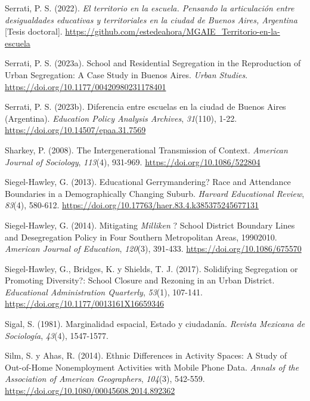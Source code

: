 \documentclass[
  spanish,
  a4paper,%
  chapterprefix=true,%
  DIV=calc,%
  twoside]{scrbook}%
\newlength{\cslhangindent}
\newenvironment{CSLReferences}[2] %
 {\begin{list}{}{%
  \setlength{\itemindent}{0pt}
  \setlength{\leftmargin}{0pt}
  \setlength{\parsep}{0pt}
  \ifodd #1
   \setlength{\leftmargin}{\cslhangindent}
   \setlength{\itemindent}{-1\cslhangindent}
  \fi
  \setlength{\itemsep}{#2\baselineskip}}}
 {\end{list}}
\begin{document}
\begin{CSLReferences}{1}{0}
Serrati, P. S. (2022). \emph{El territorio en la escuela. Pensando la articulación entre desigualdades educativas y territoriales en la ciudad de Buenos Aires, Argentina} {[}Tesis doctoral{]}. \url{https://github.com/estedeahora/MGAIE_Territorio-en-la-escuela}

Serrati, P. S. (2023a). School and Residential Segregation in the Reproduction of Urban Segregation: A Case Study in Buenos Aires. \emph{Urban Studies}. \url{https://doi.org/10.1177/00420980231178401}

Serrati, P. S. (2023b). Diferencia entre escuelas en la ciudad de Buenos Aires (Argentina). \emph{Education Policy Analysis Archives}, \emph{31}(110), 1-22. \url{https://doi.org/10.14507/epaa.31.7569}

Sharkey, P. (2008). The Intergenerational Transmission of Context. \emph{American Journal of Sociology}, \emph{113}(4), 931-969. \url{https://doi.org/10.1086/522804}

Siegel-Hawley, G. (2013). Educational Gerrymandering? Race and Attendance Boundaries in a Demographically Changing Suburb. \emph{Harvard Educational Review}, \emph{83}(4), 580-612. \url{https://doi.org/10.17763/haer.83.4.k385375245677131}

Siegel-Hawley, G. (2014). Mitigating {\emph{Milliken}} ? School District Boundary Lines and Desegregation Policy in Four Southern Metropolitan Areas, 1990{\textendash}2010. \emph{American Journal of Education}, \emph{120}(3), 391-433. \url{https://doi.org/10.1086/675570}

Siegel-Hawley, G., Bridges, K. y Shields, T. J. (2017). Solidifying Segregation or Promoting Diversity?: School Closure and Rezoning in an Urban District. \emph{Educational Administration Quarterly}, \emph{53}(1), 107-141. \url{https://doi.org/10.1177/0013161X16659346}

Sigal, S. (1981). Marginalidad espacial, Estado y ciudadanía. \emph{Revista Mexicana de Sociología}, \emph{43}(4), 1547-1577.

Silm, S. y Ahas, R. (2014). Ethnic Differences in Activity Spaces: A Study of Out-of-Home Nonemployment Activities with Mobile Phone Data. \emph{Annals of the Association of American Geographers}, \emph{104}(3), 542-559. \url{https://doi.org/10.1080/00045608.2014.892362}


\end{CSLReferences}
\end{document}
